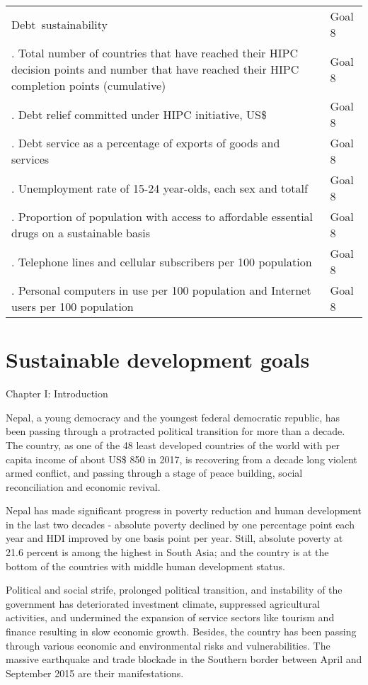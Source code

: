 \documentclass[
  openany]{book}
\begin{document}
\begin{longtable}{>{\raggedright\arraybackslash}p{33em}l}
Debt sustainability & Goal 8\\
42.  Total number of countries that have reached their HIPC decision points and number that have reached their HIPC completion points (cumulative) & Goal 8\\
43.  Debt relief committed under HIPC initiative, US\$ & Goal 8\\
44.  Debt service as a percentage of exports of goods and services & Goal 8\\
45.  Unemployment rate of 15-24 year-olds, each sex and totalf & Goal 8\\
\addlinespace
46.  Proportion of population with access to affordable essential drugs on a sustainable basis & Goal 8\\
47.  Telephone lines and cellular subscribers per 100 population & Goal 8\\
48.  Personal computers in use per 100 population and Internet users per 100 population & Goal 8\\
\bottomrule
\end{longtable}

\hypertarget{sustainable-development-goals}{%
\section{Sustainable development goals}\label{sustainable-development-goals}}

Chapter I: Introduction

Nepal, a young democracy and the youngest federal democratic republic, has been passing through a protracted political transition for more than a decade. The country, as one of the 48 least developed countries of the world with per capita income of about US\$ 850 in 2017, is recovering from a decade long violent armed conflict, and passing through a stage of peace building, social reconciliation and economic revival.

Nepal has made significant progress in poverty reduction and human development in the last two decades - absolute poverty declined by one percentage point each year and HDI improved by one basis point per year. Still, absolute poverty at 21.6 percent is among the highest in South Asia; and the country is at the bottom of the countries with middle human development status.

Political and social strife, prolonged political transition, and instability of the government has deteriorated investment climate, suppressed agricultural activities, and undermined the expansion of service sectors like tourism and finance resulting in slow economic growth. Besides, the country has been passing through various economic and environmental risks and vulnerabilities. The massive earthquake and trade blockade in the Southern border between April and September 2015 are their manifestations.
\end{document}
